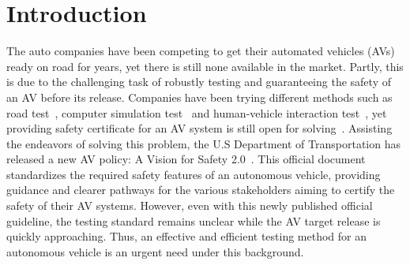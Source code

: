\documentclass[letterpaper, 10 pt, journal]{IEEEtran}  %
\newcommand{\mansur}[1]{\textcolor{blue}{[Mansur: #1]}}
\begin{document}
\section{Introduction}


The auto companies have been competing to get their automated vehicles (AVs) ready on road for years, yet there is still none available in the market. Partly, this is due to the challenging task of robustly testing and guaranteeing the safety of an AV before its release. Companies have been trying different methods such as road test~\cite{wardle_2017,newman_2017}, computer simulation test~\cite{madrigal_2017} and human-vehicle interaction test~\cite{petters,toor_warren_2017}, yet providing safety certificate for an AV system is still open for solving~\cite{wardle_2017}. Assisting the endeavors of solving this problem, the U.S Department of Transportation has released a new AV policy: A Vision for Safety 2.0~\cite{james_2017}. This official document standardizes the required safety features of an autonomous vehicle, providing guidance and clearer pathways for the various stakeholders aiming to certify the safety of their AV systems. However, even with this newly published official guideline, the testing standard remains unclear while the AV target release is quickly approaching. Thus, an effective and efficient testing method for an autonomous vehicle is an urgent need under this background.

\end{document}
